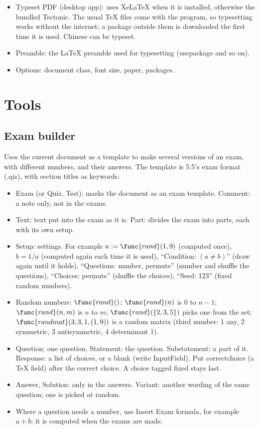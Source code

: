 \begin{itemize}
\item Typeset PDF (desktop app): uses XeLaTeX when it is installed, otherwise the bundled Tectonic. The usual TeX files come with the program, so typesetting works without the internet; a package outside them is downloaded the first time it is used. Chinese can be typeset.
\item Preamble: the LaTeX preamble used for typesetting (\TEXTsymbol{\backslash}usepackage and so on).
\item Options: document class, font size, paper, packages.
\end{itemize}

\section{Tools}

\subsection{Exam builder}

Uses the current document as a template to make several versions of an exam, with different numbers, and their answers. The template is 5.5's exam format (.qiz), with section titles as keywords:

\begin{itemize}
\item Exam (or Quiz, Test): marks the document as an exam template. Comment: a note only, not in the exams.
\item Text: text put into the exam as it is. Part: divides the exam into parts, each with its own setup.
\item Setup: settings. For example $a:=\func{rand}(1,9)$ (computed once), $b=1/a$ (computed again each time it is used), ``Condition: $(a\neq b)$'' (draw again until it holds), ``Questions: number, permute'' (number and shuffle the questions), ``Choices: permute'' (shuffle the choices), ``Seed: 123'' (fixed random numbers).
\item Random numbers: $\func{rand}()$; $\func{rand}(n)$ is 0 to $n-1$; $\func{rand}(n,m)$ is $n$ to $m$; $\func{rand}(\{2,3,5\})$ picks one from the set; $\func{randmat}(3,3,1,(1,9))$ is a random matrix (third number: 1 any, 2 symmetric, 3 antisymmetric, 4 determinant 1).
\item Question: one question. Statement: the question. Substatement: a part of it. Response: a list of choices, or a blank (write InputField). Put \TEXTsymbol{\backslash}correctchoice (a TeX field) after the correct choice. A choice tagged fixed stays last.
\item Answer, Solution: only in the answers. Variant: another wording of the same question; one is picked at random.
\item Where a question needs a number, use Insert \TEXTsymbol{>} Exam formula, for example $a+b$; it is computed when the exams are made.
\end{itemize}

